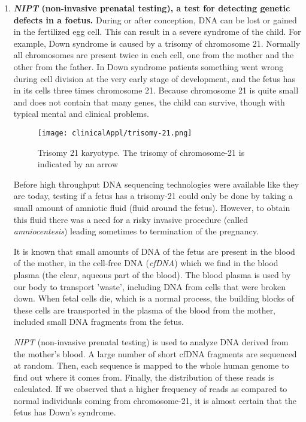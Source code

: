 \begin{enumerate}
	\item \textbf{\emph{NIPT} (non-invasive prenatal testing), a test for detecting genetic defects in a foetus.}\newline
	During or after conception, DNA can be lost or gained in the fertilized egg cell. This can result in a severe syndrome of the child. For example, Down syndrome is caused by a trisomy of chromosome 21. Normally all chromosomes are present twice in each cell, one from the mother and the other from the father. In Down syndrome patients something went wrong during cell division at the very early stage of development, and the fetus has in its cells three times chromosome 21. 
	Because chromosome 21 is quite small and does not contain that many genes, the child can survive, though with typical mental and clinical problems.
	
	\begin{figure}[H]
		\centering
		\texttt{[image: clinicalAppl/trisomy-21.png]}
		\caption{Trisomy 21 karyotype. The trisomy of chromosome-21 is indicated by an arrow}
		\label{fig:tri21}
	\end{figure}
	
	
	Before high throughput DNA sequencing technologies were available like they are today, testing if a fetus has a trisomy-21 could only be done by taking a small amount of amniotic fluid (fluid around the fetus). However, to obtain this fluid there was a need for a risky invasive procedure (called \emph{amniocentesis}) leading sometimes to termination of the pregnancy.
	
	It is known that small amounts of DNA of the fetus are present in the blood of the mother, in the cell-free DNA (\emph{cfDNA}) which we find in the blood plasma (the clear, aqueous part of the blood). The blood plasma is used by our body to transport 'waste', including DNA from cells that were broken down. When fetal cells die, which is a normal process, the building blocks of these cells are transported in the plasma of the blood from the mother, included small DNA fragments from the fetus.
	
	\emph{NIPT} (non-invasive prenatal testing) is used to analyze DNA derived from the mother's blood. A large number of short cfDNA fragments are sequenced at random.  Then, each sequence is mapped to the whole human genome to find out where it comes from. Finally, the distribution of these reads is calculated. If we observed that a higher frequency of reads as compared to normal individuals coming from chromosome-21, it is almost certain that the fetus has Down's syndrome.
	

\end{enumerate}
